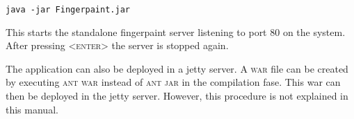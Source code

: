 \begin{verbatim}
java -jar Fingerpaint.jar
\end{verbatim}

This starts the standalone fingerpaint server listening to port 80 on the system. After pressing \textsc{<enter>} the server is stopped again.

The application can also be deployed in a jetty server. A \textsc{war} file can be created by executing \textsc{ant war} instead of \textsc{ant jar} in the compilation fase. This war can then be deployed in the jetty server. However, this procedure is not explained in this manual.